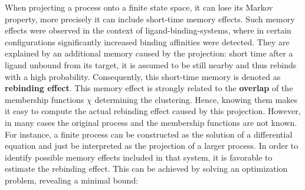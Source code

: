 	When projecting a process onto a finite state space, it can lose its Markov property, more precisely it can include short-time memory effects.
	Such memory effects were observed in the context of ligand-binding-systems, where in certain configurations significantly increased binding affinities were detected. %
	They are explained by an additional memory caused by the projection: short time after a ligand unbound from its target, it is assumed to be still nearby and thus rebinds with a high probability. Consequently, this short-time memory is denoted as \textbf{rebinding effect}.
	This memory effect is strongly related to the \textbf{overlap} of the membership functions $\chi$ determining the clustering. %
	Hence, knowing them makes it easy to compute the actual rebinding effect caused by this projection.
	However, in many cases the original process and the membership functions are not known. For instance, a finite process can be constructed as the solution of a differential equation and just be interpreted as the projection of a larger process. In order to identify possible memory effects included in that system, it is favorable to estimate the rebinding effect. This can be achieved by solving an optimization problem, revealing a minimal bound: %
	\\
	
